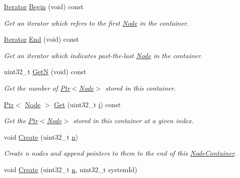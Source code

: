 \begin{DoxyCompactItemize}
\item 
\hyperlink{classns3_1_1NodeContainer_aa1a9f2d2b09bfef7d066d3974bca2cc4}{Iterator} \hyperlink{classns3_1_1NodeContainer_adf0f639aff139db107526288777eb533}{Begin} (void) const 
\begin{DoxyCompactList}\small\item\em Get an iterator which refers to the first \hyperlink{classns3_1_1Node}{Node} in the container. \end{DoxyCompactList}\item 
\hyperlink{classns3_1_1NodeContainer_aa1a9f2d2b09bfef7d066d3974bca2cc4}{Iterator} \hyperlink{classns3_1_1NodeContainer_a8ea0bcac137597d192c5e6b95ca60464}{End} (void) const 
\begin{DoxyCompactList}\small\item\em Get an iterator which indicates past-\/the-\/last \hyperlink{classns3_1_1Node}{Node} in the container. \end{DoxyCompactList}\item 
uint32\+\_\+t \hyperlink{classns3_1_1NodeContainer_aed647ac56d0407a7706aba02eb44b951}{GetN} (void) const 
\begin{DoxyCompactList}\small\item\em Get the number of \hyperlink{classns3_1_1Ptr}{Ptr$<$\+Node$>$} stored in this container. \end{DoxyCompactList}\item 
\hyperlink{classns3_1_1Ptr}{Ptr}$<$ \hyperlink{classns3_1_1Node}{Node} $>$ \hyperlink{classns3_1_1NodeContainer_a9ed96e2ecc22e0f5a3d4842eb9bf90bf}{Get} (uint32\+\_\+t \hyperlink{lte__uplink__power__control_8m_a6f6ccfcf58b31cb6412107d9d5281426}{i}) const 
\begin{DoxyCompactList}\small\item\em Get the \hyperlink{classns3_1_1Ptr}{Ptr$<$\+Node$>$} stored in this container at a given index. \end{DoxyCompactList}\item 
void \hyperlink{classns3_1_1NodeContainer_a787f059e2813e8b951cc6914d11dfe69}{Create} (uint32\+\_\+t \hyperlink{lte__link__budget__x2__handover__measures_8m_abdb05bc5a064cf642a06c83b3392f148}{n})
\begin{DoxyCompactList}\small\item\em Create n nodes and append pointers to them to the end of this \hyperlink{classns3_1_1NodeContainer}{Node\+Container}. \end{DoxyCompactList}\item 
void \hyperlink{classns3_1_1NodeContainer_af79b99d07cc03833be7896c0a228db35}{Create} (uint32\+\_\+t \hyperlink{lte__link__budget__x2__handover__measures_8m_abdb05bc5a064cf642a06c83b3392f148}{n}, uint32\+\_\+t system\+Id)

\end{DoxyCompactItemize}
